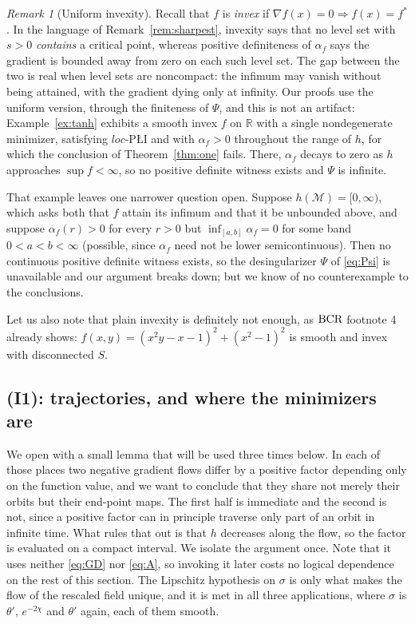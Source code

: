 \documentclass[11pt]{article}
\theoremstyle{plain}
\theoremstyle{definition}
\theoremstyle{remark}
\newtheorem{rem}[thm]{Remark}
\newcommand{\M}{\mathcal{M}}
\newcommand{\R}{\mathbb{R}}
\newcommand{\bcr}{\textup{BCR}}
\begin{document}
\begin{rem}[Uniform invexity]\label{rem:invex}
Recall that $f$ is \emph{invex} if $\nabla f(x)=0 \Rightarrow f(x)=f^*$. In the
language of Remark~\ref{rem:sharpest}, invexity says that no level set with
$s>0$ \emph{contains} a critical point, whereas positive definiteness of
$\alpha_f$ says the gradient is bounded away from zero on each such level set.
The gap between the two is real when level sets are noncompact: the infimum may
vanish without being attained, with the gradient dying only at infinity. Our
proofs use the uniform version, through the finiteness of $\Psi$, and this is not
an artifact: Example~\ref{ex:tanh} exhibits a smooth invex $f$ on $\R$ with a
single nondegenerate minimizer, satisfying $loc$-P\L{}I and with $\alpha_f>0$
throughout the range of $h$, for which the conclusion of Theorem~\ref{thm:one}
fails. There, $\alpha_f$ decays to zero as $h$ approaches $\sup f<\infty$, so no
positive definite witness exists and $\Psi$ is infinite.

That example leaves one narrower question open. Suppose $h(\M)=[0,\infty)$,
which asks both that $f$ attain its infimum and that it be unbounded above, and
suppose $\alpha_f(r)>0$ for every $r>0$ but $\inf_{[a,b]}\alpha_f = 0$ for some
band $0<a<b<\infty$ (possible, since $\alpha_f$ need not be lower
semicontinuous). Then no continuous positive definite witness exists, so the
desingularizer $\Psi$ of \eqref{eq:Psi} is unavailable and our argument breaks
down; but we know of no counterexample to the conclusions.

Let us also note that plain invexity is definitely not enough, as $\bcr$
footnote 4 already shows: $f(x,y)=(x^2y-x-1)^2+(x^2-1)^2$ is smooth and invex
with disconnected $S$.
\end{rem}

\subsection{(I1): trajectories, and where the minimizers are}

We open with a small lemma that will be used three times below. In each of those
places two negative gradient flows
differ by a positive factor depending only on the function value, and we want to
conclude that they share not merely their orbits but their end-point maps. The
first half is immediate and the second is not, since a positive factor can in
principle traverse only part of an orbit in infinite time. What rules that out is
that $h$ decreases along the flow, so the factor is evaluated on a compact
interval. We isolate the argument once. Note that it uses neither \eqref{eq:GD}
nor \eqref{eq:A}, so invoking it later costs no logical dependence on the rest of
this section. The Lipschitz hypothesis on $\sigma$ is only what makes the flow of
the rescaled field unique, and it is met in all three applications, where $\sigma$
is $\theta'$, $e^{-2\chi}$ and $\theta'$ again, each of them smooth.
\end{document}
